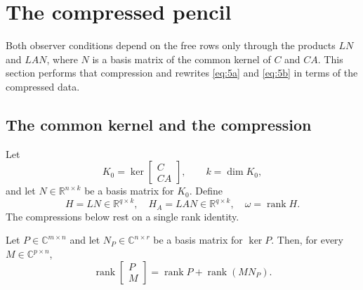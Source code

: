 \section{The compressed pencil}\label{sec:compressed}

Both observer conditions depend on the free rows only through the products $LN$ and $LAN$, where $N$ is a basis matrix of the common kernel of $C$ and $CA$. This section performs that compression and rewrites \eqref{eq:5a} and \eqref{eq:5b} in terms of the compressed data.

\subsection{The common kernel and the compression}\label{sec:compress}

Let
\begin{equation*}
K_0=\ker\begin{bmatrix}C\\ CA\end{bmatrix},\qquad k=\dim K_0,
\end{equation*}
and let $N\in\mathbb R^{n\times k}$ be a basis matrix for $K_0$. Define
\begin{equation*}
H=LN\in\mathbb R^{q\times k},\quad H_A=LAN\in\mathbb R^{q\times k},\quad \omega=\operatorname{rank}H .
\end{equation*}
The compressions below rest on a single rank identity.

\begin{lem}\label{lem:rankid}
Let $P\in\mathbb C^{m\times n}$ and let $N_P\in\mathbb C^{n\times r}$ be a basis matrix for $\ker P$. Then, for every $M\in\mathbb C^{p\times n}$,
\begin{equation}\label{eq:rankid}
\operatorname{rank}\begin{bmatrix}P\\ M\end{bmatrix}
=\operatorname{rank}P+\operatorname{rank}(MN_P).
\end{equation}
\end{lem}

